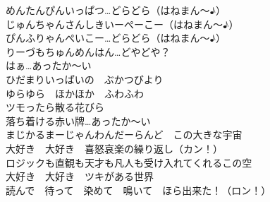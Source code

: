 {めんたんぴんいっぱつ…どらどら（はねまん〜♪）\\
じゅんちゃんさんしきいーぺーこー（はねまん〜♪）\\
ぴんふりゃんぺいこー…どらどら（はねまん〜♪）\\
りーづもちゅんめんはん…どやどや？\\
はぁ…あったか〜い\\

ひだまりいっぱいの　ぶかつびより\\
ゆらゆら　ほかほか　ふわふわ\\
ツモったら散る花びら\\
落ち着ける赤い牌…あったか〜い\\

まじかるまーじゃんわんだーらんど　この大きな宇宙\\
大好き　大好き　喜怒哀楽の繰り返し（カン！）\\
ロジックも直観も天才も凡人も受け入れてくれるこの空\\
大好き　大好き　ツキがある世界\\
読んで　待って　染めて　鳴いて　ほら出来た！（ロン！）
}

